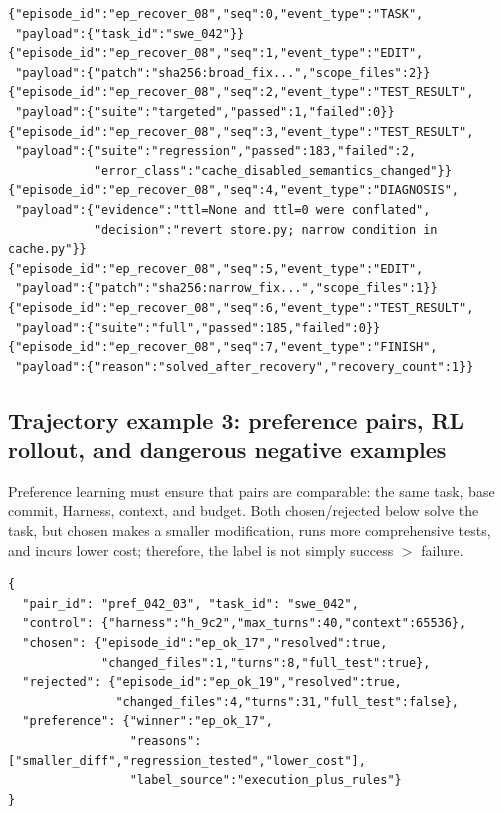 \documentclass[10pt,a4paper,UTF8,fontset=none]{ctexart}
\begin{document}
\begin{lstlisting}[style=codeblock,caption={Recovery trajectory in which an erroneous patch is corrected using regression feedback},label={lst:trajectory-recovery}]
{"episode_id":"ep_recover_08","seq":0,"event_type":"TASK",
 "payload":{"task_id":"swe_042"}}
{"episode_id":"ep_recover_08","seq":1,"event_type":"EDIT",
 "payload":{"patch":"sha256:broad_fix...","scope_files":2}}
{"episode_id":"ep_recover_08","seq":2,"event_type":"TEST_RESULT",
 "payload":{"suite":"targeted","passed":1,"failed":0}}
{"episode_id":"ep_recover_08","seq":3,"event_type":"TEST_RESULT",
 "payload":{"suite":"regression","passed":183,"failed":2,
            "error_class":"cache_disabled_semantics_changed"}}
{"episode_id":"ep_recover_08","seq":4,"event_type":"DIAGNOSIS",
 "payload":{"evidence":"ttl=None and ttl=0 were conflated",
            "decision":"revert store.py; narrow condition in cache.py"}}
{"episode_id":"ep_recover_08","seq":5,"event_type":"EDIT",
 "payload":{"patch":"sha256:narrow_fix...","scope_files":1}}
{"episode_id":"ep_recover_08","seq":6,"event_type":"TEST_RESULT",
 "payload":{"suite":"full","passed":185,"failed":0}}
{"episode_id":"ep_recover_08","seq":7,"event_type":"FINISH",
 "payload":{"reason":"solved_after_recovery","recovery_count":1}}
\end{lstlisting}

\subsection{Trajectory example 3: preference pairs, RL rollout, and dangerous negative examples}

Preference learning must ensure that pairs are comparable: the same task, base commit, Harness, context, and budget. Both chosen/rejected below solve the task, but chosen makes a smaller modification, runs more comprehensive tests, and incurs lower cost; therefore, the label is not simply success $>$ failure.

\begin{lstlisting}[style=codeblock,caption={Preference pair of trajectories for the same task},label={lst:trajectory-preference}]
{
  "pair_id": "pref_042_03", "task_id": "swe_042",
  "control": {"harness":"h_9c2","max_turns":40,"context":65536},
  "chosen": {"episode_id":"ep_ok_17","resolved":true,
             "changed_files":1,"turns":8,"full_test":true},
  "rejected": {"episode_id":"ep_ok_19","resolved":true,
               "changed_files":4,"turns":31,"full_test":false},
  "preference": {"winner":"ep_ok_17",
                 "reasons":["smaller_diff","regression_tested","lower_cost"],
                 "label_source":"execution_plus_rules"}
}
\end{lstlisting}
\end{document}
